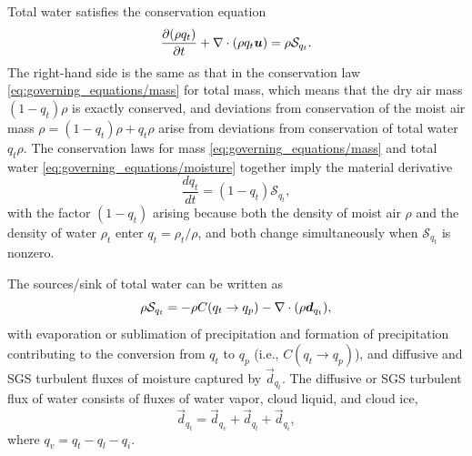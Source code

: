 \documentclass{report}
\begin{document}
Total water satisfies the conservation equation
\begin{equation}
\frac{\partial (\rho q_t)}{\partial t} + \nabla \cdot (\rho q_t \boldsymbol{{u}}) = \rho \mathcal{S}_{q_t}.   
\label{eq:governing_equations/moisture}
\end{equation}
The right-hand side is the same as that in the conservation law \eqref{eq:governing_equations/mass} for total mass, which means that the dry air mass $(1-q_t)\rho$ is exactly conserved, and deviations from conservation of the moist air mass $\rho = (1-q_t)\rho + q_t \rho$ arise from deviations from conservation of total water $q_t\rho$. The conservation laws for mass \eqref{eq:governing_equations/mass} and total water \eqref{eq:governing_equations/moisture} together imply the material derivative 
\[
\frac{dq_t}{dt} = (1-q_t) \mathcal{S}_{q_t},
\]
with the factor $(1-q_t)$ arising because both the density of moist air $\rho$ and the density of water $\rho_t$ enter $q_t = \rho_t/\rho$, and both change simultaneously when $\mathcal{S}_{q_t}$ is nonzero.

The sources/sink of total water can be written as  
\begin{equation}\label{e:water_sources}
     \rho \mathcal{S}_{q_t} = - \rho C(q_t \rightarrow q_p) - \nabla \cdot (\rho \boldsymbol{{d}}_{q_t}),
\end{equation}
with evaporation or sublimation of precipitation and formation of precipitation contributing to the conversion from $q_t$ to $q_p$ (i.e., $C(q_t \rightarrow q_p)$), and diffusive and SGS turbulent fluxes of moisture captured by $\vec{d}_{q_t}$. The diffusive or SGS turbulent flux of water consists of fluxes of water vapor, cloud liquid, and cloud ice, \begin{equation}
    \vec{d}_{q_t} =\vec{d}_{q_v} + \vec{d}_{q_l} + \vec{d}_{q_i},
\end{equation}
where $q_v = q_t - q_l - q_i$.
\end{document}

